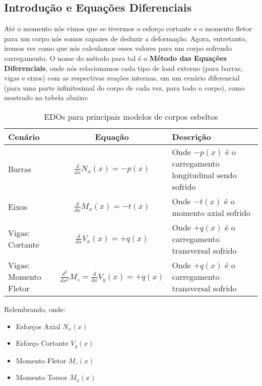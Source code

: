 \documentclass{article}
\begin{document}
            \subsection{Introdução e Equações Diferenciais}
                Até o momento nós vimos que se tivermos o esforço cortante e o momento fletor para um corpo nós somos capazes de deduzir a deformação. Agora, entretanto, iremos ver como que nós calculamos
                esses valores para um corpo sofrendo carregamento. O nome do método para tal é o \textbf{Método das Equações Diferenciais}, onde nós relacionamos cada tipo de load externo (para barras,
                vigas e eixos) com as respectivas reações internas, em um cenário diferencial (para uma parte infinitesimal do corpo de cada vez, para todo o corpo), como mostrado na tabela abaixo:

                \begin{table}[h]
                    \centering
                    \begin{tabular}{|l|c|l|}\hline
                        \textbf{Cenário} & \textbf{Equação} & \textbf{Descrição}\\ \hline
                        \rule{0pt}{4ex} Barras & $\frac{d}{dx}N_x(x) = -p(x)$ & Onde $-p(x)$ é o carregamento longitudinal sendo sofrido \\[2ex]  \hline
                        \rule{0pt}{4ex} Eixos  & $\frac{d}{dx}M_x(x) = -t(x)$ & Onde $-t(x)$ é o momento axial sofrido \\[2ex]\hline
                        \rule{0pt}{4ex} Vigas: Cortante & $\frac{d}{dx}V_x(x) = +q(x)$ & Onde $+q(x)$ é o carregamento transversal sofrido \\[2ex] \hline
                        \rule{0pt}{4ex} Vigas: Momento Fletor & $\frac{d^2}{dx^2}M_z = \frac{d}{dx}V_y(x) = +q(x)$ & Onde $+q(x)$ é o carregamento transversal sofrido \\[2ex] \hline
                        
                    \end{tabular}
                    \caption{EDOs para principais modelos de corpos esbeltos}
                \end{table}

                Relembrando, onde:
                \begin{itemize}
                    \item Esforços Axial $N_x(x)$
                    \item Esforço Cortante $V_y(x)$
                    \item Momento Fletor $M_z(x)$
                    \item Momento Torsor $M_x(x)$
                \end{itemize}
\end{document}
